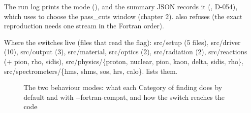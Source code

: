 The run log prints the mode (), and the summary JSON records it
(, D-054), which  uses to choose the pass\_cuts window (chapter 2).
 also refuses  (the exact reproduction needs one stream in the Fortran order).

Where the switches live (files that read the flag): src/setup (5 files), src/driver (10), src/output (3),
src/\allowbreak{}material,\allowbreak{} src/optics (2), src/\allowbreak{}radiation (2), src/\allowbreak{}reactions (+ pion, rho, sidis), src/\allowbreak{}physics/\allowbreak{}\{proton,\allowbreak{} nuclear,
pion, kaon, delta, sidis, rho\}, src/\allowbreak{}spectrometers/\allowbreak{}\{hms,\allowbreak{} shms, sos, hrs, calo\}. 
lists them.

\begin{figure}[htbp]
\caption[The two behaviour modes]{The two behaviour modes: what each Category of finding does by default and with -{}-fortran-compat,\allowbreak{} and how the switch reaches the code}\label{fig:compatu5fswitch}
\end{figure}
